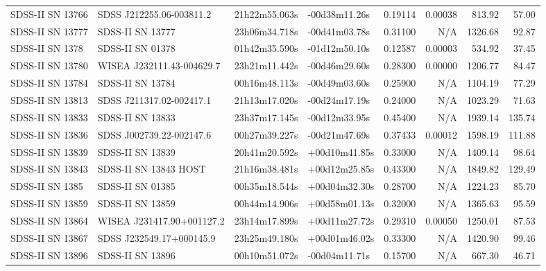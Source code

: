 \begin{longtable}{llllrrrr}
SDSS-II SN 13766 &        SDSS J212255.06-003811.2 &   21h22m55.063s &   -00d38m11.26s &  0.19114 &  0.00038 &   813.92 &       57.00 \\
SDSS-II SN 13777 &                SDSS-II SN 13777 &   23h06m34.718s &   -00d41m03.78s &  0.31100 &      N/A &  1326.68 &       92.87 \\
SDSS-II SN 1378  &                SDSS-II SN 01378 &   01h42m35.590s &   -01d12m50.10s &  0.12587 &  0.00003 &   534.92 &       37.45 \\
SDSS-II SN 13780 &       WISEA J232111.43-004629.7 &   23h21m11.442s &   -00d46m29.60s &  0.28300 &  0.00000 &  1206.77 &       84.47 \\
SDSS-II SN 13784 &                SDSS-II SN 13784 &   00h16m48.113s &   -00d49m03.60s &  0.25900 &      N/A &  1104.19 &       77.29 \\
SDSS-II SN 13813 &        SDSS J211317.02-002417.1 &   21h13m17.020s &   -00d24m17.19s &  0.24000 &      N/A &  1023.29 &       71.63 \\
SDSS-II SN 13833 &                SDSS-II SN 13833 &   23h37m17.145s &   -00d12m33.95s &  0.45400 &      N/A &  1939.14 &      135.74 \\
SDSS-II SN 13836 &        SDSS J002739.22-002147.6 &   00h27m39.227s &   -00d21m47.69s &  0.37433 &  0.00012 &  1598.19 &      111.88 \\
SDSS-II SN 13839 &                SDSS-II SN 13839 &   20h41m20.592s &   +00d10m41.85s &  0.33000 &      N/A &  1409.14 &       98.64 \\
SDSS-II SN 13843 &           SDSS-II SN 13843 HOST &   21h16m38.481s &   +00d12m25.85s &  0.43300 &      N/A &  1849.82 &      129.49 \\
SDSS-II SN 1385  &                SDSS-II SN 01385 &   00h35m18.544s &   +00d04m32.30s &  0.28700 &      N/A &  1224.23 &       85.70 \\
SDSS-II SN 13859 &                SDSS-II SN 13859 &   00h44m14.906s &   +00d58m01.13s &  0.32000 &      N/A &  1365.63 &       95.59 \\
SDSS-II SN 13864 &       WISEA J231417.90+001127.2 &   23h14m17.899s &   +00d11m27.72s &  0.29310 &  0.00050 &  1250.01 &       87.53 \\
SDSS-II SN 13867 &        SDSS J232549.17+000145.9 &   23h25m49.180s &   +00d01m46.02s &  0.33300 &      N/A &  1420.90 &       99.46 \\
SDSS-II SN 13896 &                SDSS-II SN 13896 &   00h10m51.072s &   -00d04m11.71s &  0.15700 &      N/A &   667.30 &       46.71 \\

\end{longtable}
